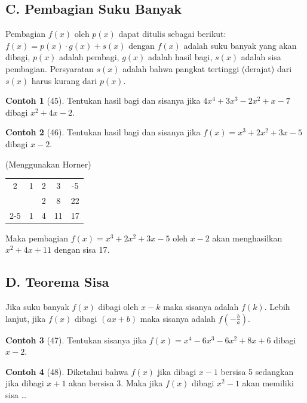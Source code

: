 \documentclass[12pt]{scrartcl}
\theoremstyle{definition}
\newtheorem{contoh}{Contoh}
\begin{document}
\subsection*{C. Pembagian Suku Banyak}
Pembagian $f(x)$ oleh $p(x)$ dapat ditulis sebagai berikut:
$f(x) = p(x) \cdot g(x) + s(x)$
dengan $f(x)$ adalah suku banyak yang akan dibagi, $p(x)$ adalah pembagi, $g(x)$ adalah hasil bagi, $s(x)$ adalah sisa pembagian. 
Persyaratan $s(x)$ adalah bahwa pangkat tertinggi (derajat) dari $s(x)$ harus kurang dari $p(x)$. 

\begin{contoh}[45]
Tentukan hasil bagi dan sisanya jika $4x^4 + 3x^3 - 2x^2 + x - 7$ dibagi $x^2 + 4x - 2$.
\end{contoh}

\begin{contoh}[46]
Tentukan hasil bagi dan sisanya jika $f(x) = x^3 + 2x^2 + 3x - 5$ dibagi $x-2$.
\end{contoh}
\begin{solusi}
(Menggunakan Horner)
\begin{center}
\begin{tabular}{c | c c c | c}
2 & 1 & 2 & 3 & -5 \\
  &   & 2 & 8 & 22 \\
\cline{2-5}
  & 1 & 4 & 11 & 17 \\
\end{tabular}
\end{center}
Maka pembagian $f(x) = x^3 + 2x^2 + 3x - 5$ oleh $x-2$ akan menghasilkan $x^2+4x+11$ dengan sisa 17. 
\end{solusi}

\subsection*{D. Teorema Sisa}
Jika suku banyak $f(x)$ dibagi oleh $x-k$ maka sisanya adalah $f(k)$. 
Lebih lanjut, jika $f(x)$ dibagi $(ax+b)$ maka sisanya adalah $f(-\frac{b}{a})$. 

\begin{contoh}[47]
Tentukan sisanya jika $f(x) = x^4 - 6x^3 - 6x^2 + 8x + 6$ dibagi $x-2$.
\end{contoh}

\begin{contoh}[48]
Diketahui bahwa $f(x)$ jika dibagi $x-1$ bersisa 5 sedangkan jika dibagi $x+1$ akan bersisa 3. Maka jika $f(x)$ dibagi $x^2-1$ akan memiliki sisa \dots
\end{contoh}
\end{document}
